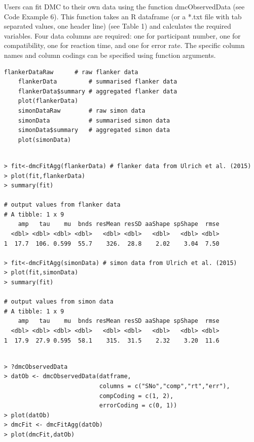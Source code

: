 Users can fit DMC to their own data using the function dmcObservedData (see
Code Example 6). This function takes an R dataframe (or a *.txt file with tab
separated values, one header line) (see Table 1) and calculates the required
variables. Four data columns are required: one for participant number, one for
compatibility, one for reaction time, and one for error rate. The specific
column names and column codings can be specified using function arguments.

\begin{minipage}{\linewidth}
    \begin{lstlisting}[style = R, title = {R Code Example 4}, captionpos = t]
    flankerDataRaw      # raw flanker data
    flankerData         # summarised flanker data
    flankerData$summary # aggregated flanker data
    plot(flankerData)
    simonDataRaw        # raw simon data
    simonData           # summarised simon data
    simonData$summary   # aggregated simon data
    plot(simonData)
    
\end{lstlisting}
\end{minipage}

\begin{minipage}{\linewidth}
    \begin{lstlisting}[style = R, title = {R Code Example 5}, captionpos = t]
> fit<-dmcFitAgg(flankerData) # flanker data from Ulrich et al. (2015)
> plot(fit,flankerData)
> summary(fit)

# output values from flanker data
# A tibble: 1 x 9 
    amp   tau    mu  bnds resMean resSD aaShape spShape  rmse
  <dbl> <dbl> <dbl> <dbl>   <dbl> <dbl>   <dbl>   <dbl> <dbl>
1  17.7  106. 0.599  55.7    326.  28.8    2.02    3.04  7.50

> fit<-dmcFitAgg(simonData) # simon data from Ulrich et al. (2015)
> plot(fit,simonData)
> summary(fit)

# output values from simon data
# A tibble: 1 x 9
    amp   tau    mu  bnds resMean resSD aaShape spShape  rmse
  <dbl> <dbl> <dbl> <dbl>   <dbl> <dbl>   <dbl>   <dbl> <dbl>
1  17.9  27.9 0.595  58.1    315.  31.5    2.32    3.20  11.6
    
\end{lstlisting}
\end{minipage}



\begin{minipage}{\linewidth}
    \begin{lstlisting}[style = R, title = {R Code Example 6}, captionpos = t]
> ?dmcObservedData
> datOb <- dmcObservedData(datframe, 
                           columns = c("SNo","comp","rt","err"), 
                           compCoding = c(1, 2), 
                           errorCoding = c(0, 1)) 
> plot(datOb)
> dmcFit <- dmcFitAgg(datOb)
> plot(dmcFit,datOb)
    
\end{lstlisting}
\end{minipage}

